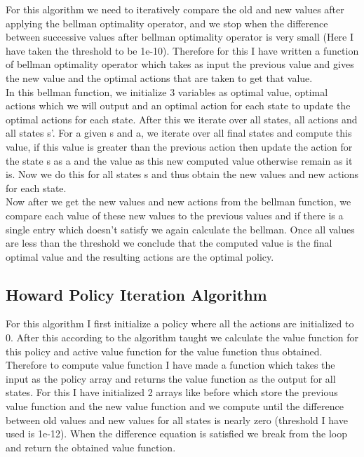 \documentclass{article}
\begin{document}
For this algorithm we need to iteratively compare the old and new values after applying the bellman optimality operator, and we stop when the difference between successive values after bellman optimality operator is very small (Here I have taken the threshold to be 1e-10). Therefore for this I have written a function of bellman optimality operator which takes as input the previous value and gives the new value and the optimal actions that are taken to get that value. \\


In this bellman function, we initialize 3 variables as optimal value, optimal actions which we will output and an optimal action for each state to update the optimal actions for each state. After this we iterate over all states, all actions and all states s'. For a given s and a, we iterate over all final states and compute this value, if this value is greater than the previous action then update the action for the state s as a and the value as this new computed value  otherwise remain as it is. Now we do this for all states s and thus obtain the new values and new actions for each state.\\

Now after we get the new values and new actions from the bellman function, we compare each value of these new values to the previous values and if there is a single entry which doesn't satisfy we again calculate the bellman. Once all values are less than the threshold we conclude that the computed value is the final optimal value and the resulting actions are the optimal policy.


\subsection{Howard Policy Iteration Algorithm}

For this algorithm I first initialize a policy where all the actions are initialized to 0. After this according to the algorithm taught we calculate the value function for this policy and active value function for the value function thus obtained. \\

Therefore to compute value function I have made a function which takes the input as the policy array and returns the value function as the output for all states. For this I have initialized 2 arrays like before which store the previous value function and the new value function and we compute until the difference between old values and new values for all states is nearly zero (threshold I have used is 1e-12). When the difference equation is satisfied we break from the loop and return the obtained value function. \\
\end{document}

